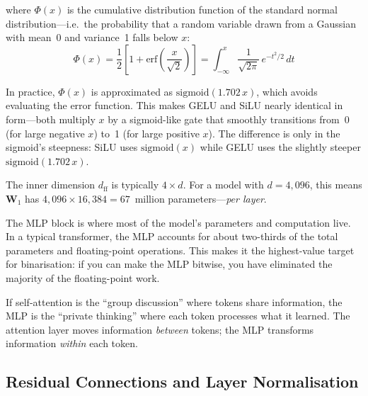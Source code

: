 where $\Phi(x)$ is the cumulative distribution function of the
standard normal distribution---i.e.\ the probability that a random
variable drawn from a Gaussian with mean~0 and variance~1 falls
below $x$:
\begin{equation}
  \Phi(x) = \frac{1}{2}\left[1 + \text{erf}\!\left(\frac{x}{\sqrt{2}}\right)\right]
  = \int_{-\infty}^{x} \frac{1}{\sqrt{2\pi}}\, e^{-t^2/2}\, dt
  \label{eq:phi}
\end{equation}

In practice, $\Phi(x)$ is approximated as
$\text{sigmoid}(1.702\, x)$, which avoids evaluating the error
function. This makes GELU and SiLU nearly identical in form---both
multiply $x$ by a sigmoid-like gate that smoothly transitions from~0
(for large negative $x$) to~1 (for large positive $x$). The
difference is only in the sigmoid's steepness: SiLU uses
$\text{sigmoid}(x)$ while GELU uses the slightly steeper
$\text{sigmoid}(1.702\, x)$.

The inner dimension $d_{\text{ff}}$ is typically $4 \times d$. For a
model with $d = 4{,}096$, this means $\bm{W}_1$ has $4{,}096 \times
16{,}384 = 67$~million parameters---\emph{per layer}.

\begin{engineernote}
The MLP block is where most of the model's parameters and computation
live. In a typical transformer, the MLP accounts for about two-thirds
of the total parameters and floating-point operations. This makes it
the highest-value target for binarisation: if you can make the MLP
bitwise, you have eliminated the majority of the floating-point work.
\end{engineernote}

\begin{analogy}
If self-attention is the ``group discussion'' where tokens share
information, the MLP is the ``private thinking'' where each token
processes what it learned. The attention layer moves information
\emph{between} tokens; the MLP transforms information \emph{within}
each token.
\end{analogy}

\subsection{Residual Connections and Layer Normalisation}
\label{sec:residual-layernorm}

